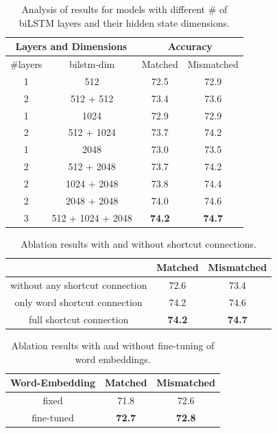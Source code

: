 \documentclass[11pt,letterpaper]{article}
\begin{document}
\begin{table}[ht!]
\begin{center}
\small
\begin{tabular}{|c|c|cc|}
\hline
\multicolumn{2}{|c|}{Layers and Dimensions} & \multicolumn{2}{|c|}{Accuracy} \\
\hline
\#layers & bilstm-dim & Matched & Mismatched \\
\hline
1 & 512 & 72.5 & 72.9\\
2 & 512 + 512 & 73.4 & 73.6\\
1 & 1024 & 72.9 & 72.9\\
2 & 512 + 1024 & 73.7 & 74.2\\
1 & 2048 & 73.0 & 73.5\\
2 & 512 + 2048 & 73.7 & 74.2\\
2 & 1024 + 2048 & 73.8 & 74.4\\
2 & 2048 + 2048 & 74.0 & 74.6\\
3 & 512 + 1024 + 2048 & \textbf{74.2} & \textbf{74.7}\\
\hline
\end{tabular}
\end{center}
\caption{Analysis of results for models with different \# of biLSTM layers and their hidden state dimensions.
}\label{tab:lstmlayersdims}
\end{table}


\begin{table}[ht!]
\begin{center}
\small
\begin{tabular}{|c|cc|}
\hline
& Matched & Mismatched \\
\hline
without any shortcut connection & 72.6 & 73.4\\
only word shortcut connection & 74.2 & 74.6\\
full shortcut connection & \textbf{74.2} & \textbf{74.7}\\
\hline
\end{tabular}
\end{center}
\caption{Ablation results with and without shortcut connections.}\label{tab:residual}
\end{table}

\begin{table}[ht!]
\begin{center}
\small
\begin{tabular}{|c|cc|}
\hline
Word-Embedding & Matched & Mismatched \\
\hline
fixed & 71.8 & 72.6\\
fine-tuned & \textbf{72.7} & \textbf{72.8}\\
\hline
\end{tabular}
\end{center}
\caption{Ablation results with and without fine-tuning of word embeddings.}\label{tab:ftwordembedding}
\end{table}
\end{document}
